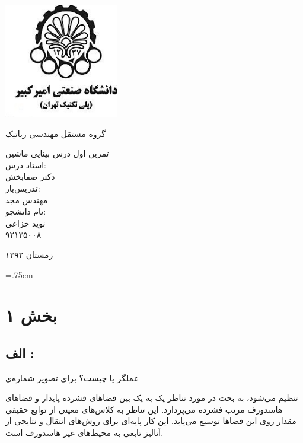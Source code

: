 \documentclass[12pt,a4paper]{article}
\theoremstyle{definition}
\theoremstyle{theorem}
\theoremstyle{definition}
\begin{document}
\thispagestyle{empty}
\vspace*{-28mm}
\centerline{\includegraphics[height=5cm]{logo.jpg}}
\begin{center}
\vspace{-2mm}
{\large \titr
گروه مستقل مهندسی رباتیک
\\[2.1cm]
}

{\Large \titr
تمرین اول درس بینایی ماشین
\\[2cm]
استاد درس:
\\[.5cm]
دکتر صفابخش
\\[1.5cm]
\large 
تدریس‌یار: 
\\[0.5cm]
مهندس مجد
\\[1.5cm]
نام دانشجو:
\\[.5cm]
نوید خزاعی
\\[.5cm]
۹۲۱۳۵۰۰۸
\\[1.5cm]
}
\baselineskip=1cm

{\large
زمستان ۱۳۹۲
}
\end{center}
\newpage
\baselineskip=1cm
\tableofcontents

\baselineskip=.75cm
\newpage 
\section{بخش ۱}
\subsection{الف : }
 عملگر 
یا 
چیست؟ برای تصویر شماره‌ی 
 

تنظیم می‌شود، به بحث در مورد تناظر یک ‌به ‌یک بین فضاهای فشرده پایدار و فضاهای هاسدورف مرتب فشرده می‌پردازد. این تناظر به کلاس‌های معینی از توابع حقیقی مقدار روی این فضاها توسیع می‌یابد. این کار پایه‌ای برای روش‌های انتقال و نتایجی از آنالیز تابعی به محیط‌های غیر هاسدورف است.
\end{document}
